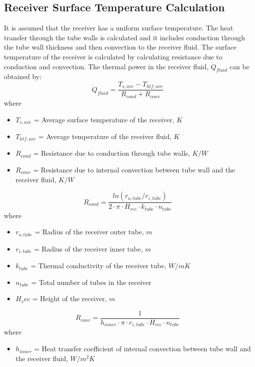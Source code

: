 \subsection{Receiver Surface Temperature Calculation}
It is assumed that the receiver has a uniform surface temperature. The heat transfer through the tube walls is calculated and it includes conduction through the tube wall thickness and then convection to the receiver fluid. The surface temperature of the receiver is calculated by calculating resistance due to conduction and convection. The thermal power in the receiver fluid, $\dot Q_{fluid}$ can be obtained by:
\begin{equation}
\dot Q_{fluid} = \frac {T_{s,ave}-T_{htf,ave}}{R_{cond}+R_{conv}}
\end{equation}
where 
\begin{itemize}
	\item $T_{s,ave}$ = Average surface temperature of the receiver, $K$
	\item $T_{htf,ave}$ = Average temperature of the receiver fluid, $K$
	\item $R_{cond}$ = Resistance due to conduction through tube walls, $K/W$
	\item $R_{conv}$ = Resistance due to internal convection between tube wall and the receiver fluid, $K/W$
\end{itemize}
\begin{equation}
R_{cond} = \frac{ln(r_{o,tube}/r_{i,tube})}{2\cdot \pi\cdot H_{rec}\cdot k_{tube}\cdot n_{tube}}
\end{equation}
where 
\begin{itemize}
	\item $r_{o,tube}$ = Radius of the receiver outer tube, $m$
	\item  $ r_{i,tube}$ =  Radius of the receiver inner tube, $m$
	\item $ k_{tube}$ = Thermal conductivity of the receiver tube, $W/m K$ 
	\item $ n_{tube}$ = Total number of tubes in the receiver
	\item $H_rec$ = Height of the receiver, $m$
\end{itemize}
\begin{equation}
R_{conv} = \frac {1}{h_{inner}\cdot \pi\cdot r_{i,tube}\cdot H_{rec}\cdot n_{tube}}
\end{equation}
where 
\begin{itemize}
	\item $ h_{inner} $ = Heat transfer coefficient of internal convection between tube wall and the receiver fluid, $W/m^2 K$
\end{itemize}
